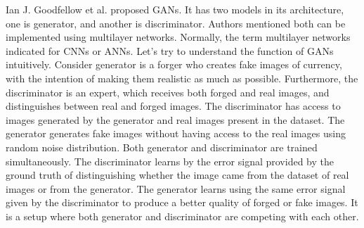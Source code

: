 Ian J. Goodfellow et al.\cite{goodfellow2014generative} proposed \acp{GAN}. It has two models in its architecture, one is generator, and another is discriminator. Authors mentioned both can be implemented using multilayer networks. Normally, the term multilayer networks indicated for \acp{CNN} or \acp{ANN}. Let's try to understand the function of \acp{GAN} intuitively. Consider generator is a forger who creates fake images of currency, with the intention of making them realistic as much as possible. Furthermore, the discriminator is an expert, which receives both forged and real images, and distinguishes between real and forged images. The discriminator has access to images generated by the generator and real images present in the dataset. The generator generates fake images without having access to the real images using random noise distribution. Both generator and discriminator are trained simultaneously. The discriminator learns by the error signal provided by the ground truth of distinguishing whether the image came from the dataset of real images or from the generator. The generator learns using the same error signal given by the discriminator to produce a better quality of forged or fake images. It is a setup where both generator and discriminator are competing with each other.

